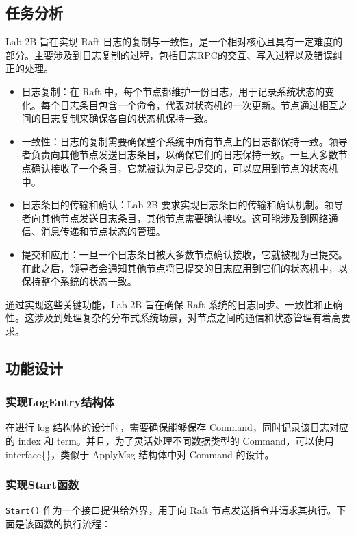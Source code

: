 \documentclass[]{article}
\begin{document}
	\subsection{任务分析}
	Lab 2B 旨在实现 Raft 日志的复制与一致性，是一个相对核心且具有一定难度的部分。主要涉及到日志复制的过程，包括日志RPC的交互、写入过程以及错误纠正的处理。
	
	\begin{itemize}
		\item 日志复制：在 Raft 中，每个节点都维护一份日志，用于记录系统状态的变化。每个日志条目包含一个命令，代表对状态机的一次更新。节点通过相互之间的日志复制来确保各自的状态机保持一致。
		\item 一致性：日志的复制需要确保整个系统中所有节点上的日志都保持一致。领导者负责向其他节点发送日志条目，以确保它们的日志保持一致。一旦大多数节点确认接收了一个条目，它就被认为是已提交的，可以应用到节点的状态机中。
		
		\item 日志条目的传输和确认：Lab 2B 要求实现日志条目的传输和确认机制。领导者向其他节点发送日志条目，其他节点需要确认接收。这可能涉及到网络通信、消息传递和节点状态的管理。
		
		\item 提交和应用：一旦一个日志条目被大多数节点确认接收，它就被视为已提交。在此之后，领导者会通知其他节点将已提交的日志应用到它们的状态机中，以保持整个系统的状态一致。
	\end{itemize}

	通过实现这些关键功能，Lab 2B 旨在确保 Raft 系统的日志同步、一致性和正确性。这涉及到处理复杂的分布式系统场景，对节点之间的通信和状态管理有着高要求。
	\subsection{功能设计}
	\subsubsection{实现LogEntry结构体}
	在进行 log 结构体的设计时，需要确保能够保存 Command，同时记录该日志对应的 index 和 term。并且，为了灵活处理不同数据类型的 Command，可以使用 interface\{\}，类似于 ApplyMsg 结构体中对 Command 的设计。
	\subsubsection{实现Start函数}
	\texttt{Start()} 作为一个接口提供给外界，用于向 Raft 节点发送指令并请求其执行。下面是该函数的执行流程：
	
\end{document}
